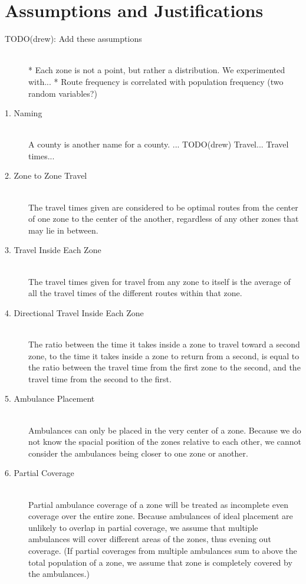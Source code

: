 \documentclass[notitlepage, 12pt]{article}
\begin{document}
\section{Assumptions and Justifications}
\begin{description}
    \item[TODO(drew): Add these assumptions] \hfill \\
    	* Each zone is not a point, but rather a distribution. We experimented with...
        * Route frequency is correlated with population frequency (two random variables?)
    \item[1. Naming] \hfill \\
    	A county is another name for a county. ... TODO(drew)
        Travel...
        Travel times...
    \item[2. Zone to Zone Travel] \hfill \\
    	The travel times given are considered to be optimal routes from the center of one zone to
        the center of the another, regardless of any other zones that may lie in between.
    \item[3. Travel Inside Each Zone] \hfill \\
    	The travel times given for travel from any zone to itself is the average
        of all the travel times of the different routes within that zone.
    \item[4. Directional Travel Inside Each Zone] \hfill \\
    	The ratio between the time it takes inside a zone to travel toward a second zone,
        to the time it takes inside a zone to return from a second, is equal to the ratio
        between the travel time from the first zone to the second, and the travel time from the
        second to the first.
    \item[5. Ambulance Placement] \hfill \\
        Ambulances can only be placed in the very center of a zone. Because we do not know the
        spacial position of the zones relative to each other, we cannot consider the ambulances
        being closer to one zone or another.
    \item[6. Partial Coverage] \hfill \\
        Partial ambulance coverage of a zone will be treated as incomplete even coverage over the entire
        zone. Because ambulances of ideal placement are unlikely to overlap in partial coverage, we assume
        that multiple ambulances will cover different areas of the zones, thus evening out coverage.
        (If partial coverages from multiple ambulances sum to above the total population of a zone,
        we assume that zone is completely covered by the ambulances.)
\end{description}
\end{document}
